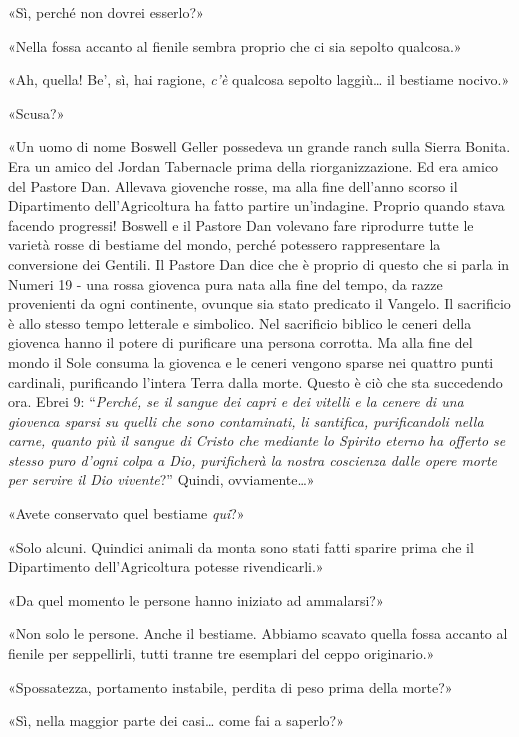 «Sì, perché non dovrei esserlo?»

«Nella fossa accanto al fienile sembra proprio che ci sia sepolto
qualcosa.»

«Ah, quella! Be', sì, hai ragione, \emph{c'è} qualcosa sepolto
laggiù\ldots{} il bestiame nocivo.»

«Scusa?»

«Un uomo di nome Boswell Geller possedeva un grande ranch sulla Sierra
Bonita. Era un amico del Jordan Tabernacle prima della riorganizzazione.
Ed era amico del Pastore Dan. Allevava giovenche rosse, ma alla fine
dell'anno scorso il Dipartimento dell'Agricoltura ha fatto partire
un'indagine. Proprio quando stava facendo progressi! Boswell e il
Pastore Dan volevano fare riprodurre tutte le varietà rosse di bestiame
del mondo, perché potessero rappresentare la conversione dei Gentili. Il
Pastore Dan dice che è proprio di questo che si parla in Numeri 19 - una
rossa giovenca pura nata alla fine del tempo, da razze provenienti da
ogni continente, ovunque sia stato predicato il Vangelo. Il sacrificio è
allo stesso tempo letterale e simbolico. Nel sacrificio biblico le
ceneri della giovenca hanno il potere di purificare una persona
corrotta. Ma alla fine del mondo il Sole consuma la giovenca e le ceneri
vengono sparse nei quattro punti cardinali, purificando l'intera Terra
dalla morte. Questo è ciò che sta succedendo ora. Ebrei 9:
``\emph{Perché, se il sangue dei capri e dei vitelli e la cenere di una
	giovenca sparsi su quelli che sono contaminati, li santifica,
	purificandoli nella carne, quanto più il sangue di Cristo che mediante
	lo Spirito eterno ha offerto se stesso puro d'ogni colpa a Dio,
	purificherà la nostra coscienza dalle opere morte per servire il Dio
	vivente}?'' Quindi, ovviamente\ldots»

«Avete conservato quel bestiame \emph{qui}?»

«Solo alcuni. Quindici animali da monta sono stati fatti sparire prima
che il Dipartimento dell'Agricoltura potesse rivendicarli.»

«Da quel momento le persone hanno iniziato ad ammalarsi?»

«Non solo le persone. Anche il bestiame. Abbiamo scavato quella fossa
accanto al fienile per seppellirli, tutti tranne tre esemplari del ceppo
originario.»

«Spossatezza, portamento instabile, perdita di peso prima della morte?»

«Sì, nella maggior parte dei casi\ldots{} come fai a saperlo?»

